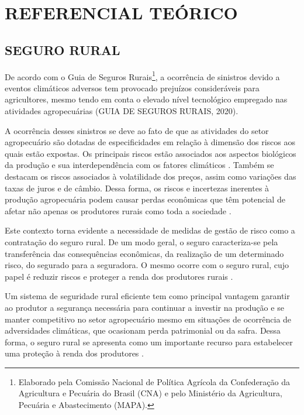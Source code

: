 \documentclass[
	12pt,				%
	openright,			%
	oneside,			%
	a4paper,			%
	chapter=TITLE,		%
	section=TITLE,		%
	english,			%
	french,				%
	spanish,			%
	brazil				%
	]{abntex2}
\begin{document}
\section{\textbf{REFERENCIAL TEÓRICO}}\label{referencial}

\subsection{SEGURO RURAL}

De acordo com o Guia de Seguros Rurais\footnote{Elaborado pela Comissão Nacional de Política Agrícola da Confederação da Agricultura e Pecuária do Brasil (CNA) e pelo Ministério da Agricultura, Pecuária e Abastecimento (MAPA).}, a ocorrência de sinistros devido a eventos climáticos adversos tem provocado prejuízos consideráveis para agricultores, mesmo tendo em conta o elevado nível tecnológico empregado nas atividades agropecuárias (GUIA DE SEGUROS RURAIS, 2020). 

A ocorrência desses sinistros se deve ao fato de que as atividades do setor agropecuário são dotadas de especificidades em relação à dimensão dos riscos aos quais estão expostas. Os principais riscos estão associados aos aspectos biológicos da produção e sua interdependência com os fatores climáticos \cite{burgo05}. Também se destacam os riscos associados à volatilidade dos preços, assim como variações das taxas de juros e de câmbio. Dessa forma, os riscos e incertezas inerentes à produção agropecuária podem causar perdas econômicas que têm potencial de afetar não apenas os produtores rurais como toda a sociedade \cite{brasil19b}. 

Este contexto torna evidente a necessidade de medidas de gestão de risco como a contratação do seguro rural. De um modo geral, o seguro caracteriza-se pela transferência das consequências econômicas, da realização de um determinado risco, do segurado para a seguradora. O mesmo ocorre com o seguro rural, cujo papel é reduzir riscos e proteger a renda dos produtores rurais \cite{guia20, brasil21}.

Um sistema de seguridade rural eficiente tem como principal vantagem garantir ao produtor a segurança necessária para continuar a investir na produção e se manter competitivo no setor agropecuário mesmo em situações de ocorrência de adversidades climáticas, que ocasionam perda patrimonial ou da safra. Dessa forma, o seguro rural se apresenta como um importante recurso para estabelecer uma proteção à renda dos produtores \cite{guia20}. 
\end{document}
